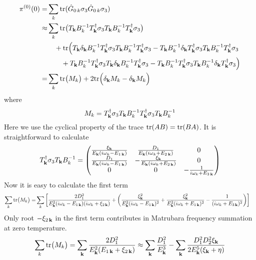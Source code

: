 \begin{equation}\label{eq:pathInt2:pi0long}
\begin{split}
\pi^{(0)}(0)=&\sum_k\text{tr}(\hat{G}_{0\,k}\sigma_3\hat{G}_{0\,k}\sigma_3)\\
	\approx&\sum_k\text{tr}\big(T_{\mathbf{k}}B_{k}^{-1}T_{\mathbf{k}}^{\dagger}\sigma_3T_{\mathbf{k}}B_{k}^{-1}T_{\mathbf{k}}^{\dagger}\sigma_3\big)\\
	&\quad+\text{tr}\Big(T_{\mathbf{k}}\delta_{\mathbf{k}}B_{k}^{-1}T_{\mathbf{k}}^{\dagger}\sigma_3T_{\mathbf{k}}B_{k}^{-1}T_{\mathbf{k}}^{\dagger}\sigma_3
	-T_{\mathbf{k}}B_{k}^{-1}\delta_{\mathbf{k}}T_{\mathbf{k}}^{\dagger}\sigma_3T_{\mathbf{k}}B_{k}^{-1}T_{\mathbf{k}}^{\dagger}\sigma_3\\
	&\qquad+T_{\mathbf{k}}B_{k}^{-1}T_{\mathbf{k}}^{\dagger}\sigma_3T_{\mathbf{k}}\delta_{\mathbf{k}}B_{k}^{-1}T_{\mathbf{k}}^{\dagger}\sigma_3
	-T_{\mathbf{k}}B_{k}^{-1}T_{\mathbf{k}}^{\dagger}\sigma_3T_{\mathbf{k}}B_{k}^{-1}\delta_{\mathbf{k}}T_{\mathbf{k}}^{\dagger}\sigma_3\Big)\\
	=&\sum_k\text{tr}\big(M_{k}\big)+2\text{tr}\Big(\delta_{\mathbf{k}}M_{k}-\delta_{\mathbf{k}}M_{k}\Big)
\end{split}
\end{equation}
where 
\begin{equation}
M_{k}=T_{\mathbf{k}}^{\dagger}\sigma_3T_{\mathbf{k}}B_{k}^{-1}T_{\mathbf{k}}^{\dagger}\sigma_3T_{\mathbf{k}}B_{k}^{-1}
\end{equation}
Here we use the cyclical  property of the trace $\text{tr}(AB)=\text{tr}(BA)$.  
It is straightforward to calculate
\begin{equation*}
T_{\mathbf{k}}^{\dagger}\sigma_3T_{\mathbf{k}}B_{k}^{-1}=
\begin{pmatrix}
{\frac{\xi_{\ensuremath{\mathbf{k}}}}{E_{\ensuremath{\mathbf{k}}}(i\omega_{k}-E_{1\,\ensuremath{\mathbf{k}}})}}&\frac{D_{1}}{E_{\mathbf{k}}(i\omega_{k}+E_{2\,\mathbf{k}})}&0\\
{\frac{D_{1}}{E_{\mathbf{k}}(i\omega_{k}-E_{1\,\mathbf{k}})}}&-\frac{\xi_{\mathbf{k}}}{E_{\mathbf{k}}(i\omega_{k}+E_{2\,\mathbf{k}})}&0\\
0&0&-\frac{1}{i\omega_{k}+E_{3\,\mathbf{k}}}\\
\end{pmatrix}
\end{equation*}
Now it is easy to calculate the first term
\begin{equation}
\begin{split}
\sum_k\text{tr}\big(M_{k}\big)=&
\sum_{k}\left[
\frac{2D_{1}^{2}}{E_{\mathbf{k}}^{2}(i\omega_{k}-E_{1\,\mathbf{k}})(i\omega_{k}+\xi_{2\,\mathbf{k}})}+
\left(\frac{\xi_{\mathbf{k}}^{2}}{E_{\mathbf{k}}^{2}(i\omega_{k}-E_{1\,\mathbf{k}})^{2}}+\frac{\xi_{\mathbf{k}}^{2}}{E_{\mathbf{k}}^{2}(i\omega_{k}+E_{1\,\mathbf{k}})^{2}}
-\frac{1}{(i\omega_{k}+E_{3\,\mathbf{k}})^{2}}\right)
\right]
\end{split}
\end{equation}
Only root $-\xi_{2\,\mathbf{k}}$ in the first term contributes in Matrubara frequency summation at zero temperature.
\begin{equation}\label{eq:pathInt2:pi0-1}
\sum_k\text{tr}\big(M_{k}\big)=\sum_{\mathbf{k}}\frac{2D_{1}^{2}}{E_{\mathbf{k}}^{2}(E_{1\,\mathbf{k}}+\xi_{2\,\mathbf{k}})}
\approx\sum_{\mathbf{k}}\frac{D_{1}^{2}}{E_{\mathbf{k}}^{3}}-\sum_{\mathbf{k}}\frac{D_{1}^{2}D_{2}^{2}\xi_{\mathbf{k}}}{2E_{\mathbf{k}}^{5}(\xi_{\mathbf{k}}+\eta)}
\end{equation}

